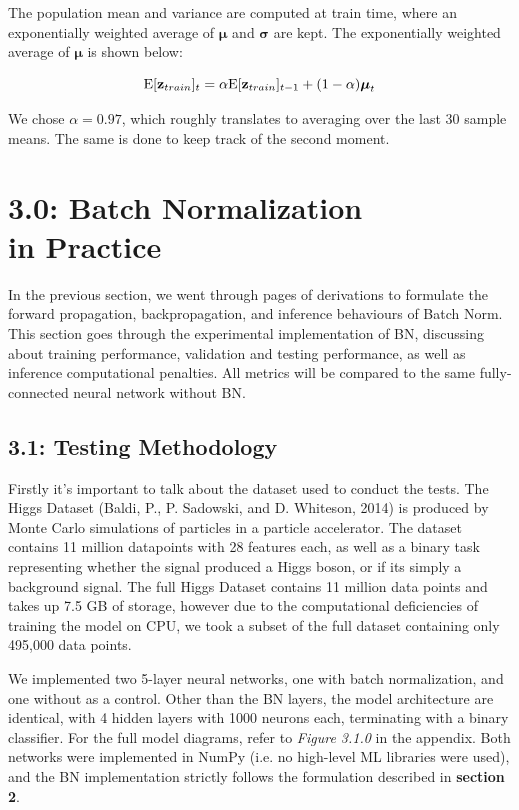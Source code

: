 \documentclass{article}
\begin{document}
\begin{multicols}{2}
The population mean and variance are computed at train time, where an 
exponentially weighted average of $\boldsymbol{\mu}$ and $\boldsymbol{\sigma}$
are kept. The exponentially weighted average of $\boldsymbol{\mu}$ is shown below:

\begin{equation}
    \text{E}[\textbf{z}_{train}]_{t} = \alpha \text{E}[\textbf{z}_{train}]_{t-1} + (1-\alpha)\boldsymbol{\mu}_t\notag
\end{equation}

We chose $\alpha = 0.97$, which roughly translates to averaging over the 
last 30 sample means. The same is done to keep track of the second moment.

\section*{3.0: Batch Normalization \\in Practice}

In the previous section, we went through pages of derivations to formulate the 
forward propagation, backpropagation, and inference behaviours of Batch Norm.
This section goes through the experimental implementation of BN, discussing
about training performance, validation and testing performance, as well as
inference computational penalties. All metrics will be compared to the same 
fully-connected neural network without BN.

\subsection*{3.1: Testing Methodology}

Firstly it's important to talk about the dataset used to conduct the tests.
The Higgs Dataset (Baldi, P., P. Sadowski, and D. Whiteson, 2014) is produced 
by Monte Carlo simulations of particles in a particle accelerator. The 
dataset contains 11 million datapoints with 28 features each, as well
as a binary task representing whether the signal produced a Higgs boson, or 
if its simply a background signal. The full Higgs Dataset contains 11 million 
data points and takes up 7.5 GB of storage, however due to the computational 
deficiencies of training the model on CPU, we took a subset of the full dataset
containing only 495,000 data points.

We implemented two 5-layer neural networks, one with batch normalization, and 
one without as a control. Other than the BN layers, the model architecture are
identical, with 4 hidden layers with 1000 neurons each, terminating with a 
binary classifier. For the full model diagrams, refer to \textit{Figure 3.1.0} 
in the appendix. Both networks were implemented in NumPy (i.e. no high-level 
ML libraries were used), and the BN implementation
strictly follows the formulation described in \textbf{section 2}.


\end{multicols}
\end{document}
